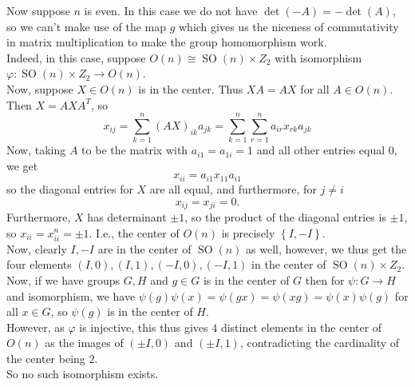 \documentclass[a4paper]{article}
\DeclareMathOperator{\SO}{SO}
\begin{document}
Now suppose $n$ is even. In this case we do not have $\det (-A) = - \det (A)$,
so we can't make use of the map $g$ which gives us the niceness of
commutativity in matrix multiplication to make the group homomorphism work.\\
Indeed, in this case, suppose $O(n) \cong \SO(n) \times Z_2$ with isomorphism
$\varphi  \colon \SO (n) \times Z_2 \to O(n)$.\\
Now, suppose $X \in O(n)$ is in the center. Thus
$X A = AX$ for all $A \in O(n)$. Then
$X = AXA^{T}$, so
 \[
x_{ij} = \sum_{k=1}^{n} \left( AX \right)_{ik} a_{jk} 
= \sum_{k=1}^{n} \sum_{r=1}^{n} a_{ir}x_{rk}a_{jk}
\] 
Now, taking $A$ to be the matrix with $a_{i 1} = a_{1 i} = 1$ and all other
entries equal $0$, we get
\[
x_{ii} = a_{i 1} x_{1 1} a_{i 1}
\] 
so the diagonal entries for $X$ are all equal, and furthermore, for $j \neq i$
\[
x_{ij} = x_{ji} = 0.
\] 
Furthermore, $X$ has determinant $\pm 1$, so the product of the diagonal
entries is $\pm 1$, so
$x_{ii} = x_{ii}^{n} = \pm 1$. I.e., 
the center of $O(n)$ is precisely $\left\{ I, -I \right\} $.\\
Now, clearly $I, -I$ are in the center of
$\SO (n)$ as well, however, we thus get
the four elements $(I,0), (I,1), (-I,0), (-I,1)$ in the center
of $\SO(n) \times Z_2$. Now, if
we have groups $G, H$ and $g \in G$ is in the center of $G$ then
for $ \psi  \colon G\to H$
 and isomorphism, we have $\psi(g) \psi(x) =\psi (gx) 
 = \psi(xg) = \psi(x) \psi(g)$ for all $x \in G$, so 
 $\psi (g)$ is in the center of $H$.\\ However, as
 $\varphi$ is injective, this thus gives $4$ distinct elements in the
 center of $O(n)$ as the images of $(\pm I, 0)$ and $(\pm I, 1)$, contradicting
 the cardinality of the center being $2$.\\ So no such isomorphism exists.\\
 \linebreak
 
\end{document}

